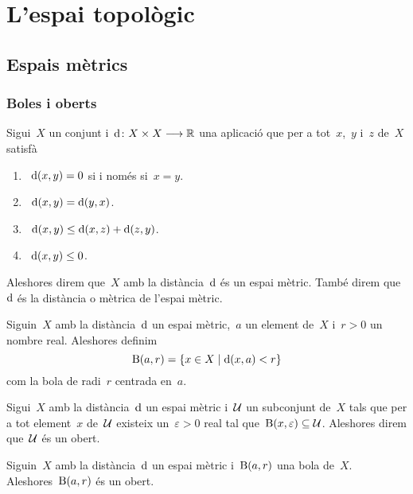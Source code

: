 \documentclass[../topologia.tex]{subfiles}
\begin{document}
\chapter{L'espai topològic}
\section{Espais mètrics}
    \subsection{Boles i oberts}
    \begin{definition}
        \label{def:espai-metric}
        \label{def:distancia}
        Sigui~\(X\) un conjunt i~\(\operatorname{d}\colon X\times X\longrightarrow\mathbb{R}\) una aplicació que per a tot~\(x\),~\(y\) i~\(z\) de~\(X\) satisfà
        \begin{enumerate}
            \item~\(\operatorname{d}(x,y)=0\) si i només si~\(x=y\).
            \item~\(\operatorname{d}(x,y)=\operatorname{d}(y,x)\).
            \item~\(\operatorname{d}(x,y)\leq\operatorname{d}(x,z)+\operatorname{d}(z,y)\).
            \item~\(\operatorname{d}(x,y)\leq0\).
        \end{enumerate}
        Aleshores direm que~\(X\) amb la distància~\(\operatorname{d}\) és un espai mètric.
        També direm que~\(\operatorname{d}\) és la distància o mètrica de l'espai mètric.
    \end{definition}
    \begin{definition}[Bola]
        \label{def:bola}
        Siguin~\(X\) amb la distància~\(\operatorname{d}\) un espai mètric,~\(a\) un element de~\(X\) i~\(r>0\) un nombre real.
        Aleshores definim
        \[
            \operatorname{B}(a,r)=\{x\in X\mid\operatorname{d}(x,a)<r\}
        \]
        com la bola de radi~\(r\) centrada en~\(a\).
    \end{definition}
    \begin{definition}[Obert]
        \label{def:obert-espai-metric}
        Sigui~\(X\) amb la distància~\(\operatorname{d}\) un espai mètric i~\(\mathcal{U}\) un subconjunt de~\(X\) tals que per a tot element~\(x\) de~\(\mathcal{U}\) existeix un~\(\varepsilon>0\) real tal que~\(\operatorname{B}(x,\varepsilon)\subseteq\mathcal{U}\).
        Aleshores direm que~\(\mathcal{U}\) és un obert.
    \end{definition}
    \begin{proposition}
        \label{prop:les-boles-son-oberts}
        Siguin~\(X\) amb la distància~\(\operatorname{d}\) un espai mètric i~\(\operatorname{B}(a,r)\) una bola de~\(X\).
        Aleshores~\(\operatorname{B}(a,r)\) és un obert.
    \end{proposition}
\end{document}
